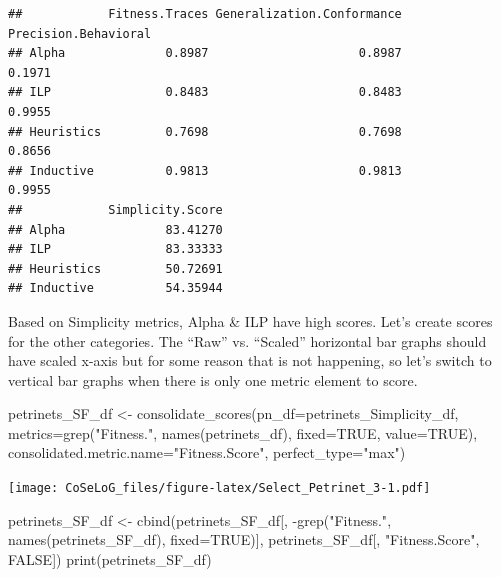 \documentclass[]{article}
\newenvironment{Shaded}{\begin{snugshade}}{\end{snugshade}}
\newcommand{\KeywordTok}[1]{\textcolor[rgb]{0.94,0.87,0.69}{{#1}}}
\newcommand{\DataTypeTok}[1]{\textcolor[rgb]{0.87,0.87,0.75}{{#1}}}
\newcommand{\StringTok}[1]{\textcolor[rgb]{0.80,0.58,0.58}{{#1}}}
\newcommand{\OtherTok}[1]{\textcolor[rgb]{0.94,0.94,0.56}{{#1}}}
\newcommand{\NormalTok}[1]{\textcolor[rgb]{0.80,0.80,0.80}{{#1}}}
\begin{document}
\begin{verbatim}
##            Fitness.Traces Generalization.Conformance Precision.Behavioral
## Alpha              0.8987                     0.8987               0.1971
## ILP                0.8483                     0.8483               0.9955
## Heuristics         0.7698                     0.7698               0.8656
## Inductive          0.9813                     0.9813               0.9955
##            Simplicity.Score
## Alpha              83.41270
## ILP                83.33333
## Heuristics         50.72691
## Inductive          54.35944
\end{verbatim}

Based on Simplicity metrics, Alpha \& ILP have high scores. Let's create
scores for the other categories. The ``Raw'' vs. ``Scaled'' horizontal
bar graphs should have scaled x-axis but for some reason that is not
happening, so let's switch to vertical bar graphs when there is only one
metric element to score.

\begin{Shaded}
\begin{Highlighting}[]
\NormalTok{petrinets_SF_df <-}\StringTok{ }\KeywordTok{consolidate_scores}\NormalTok{(}\DataTypeTok{pn_df=}\NormalTok{petrinets_Simplicity_df, }
        \DataTypeTok{metrics=}\KeywordTok{grep}\NormalTok{(}\StringTok{"Fitness."}\NormalTok{, }\KeywordTok{names}\NormalTok{(petrinets_df), }\DataTypeTok{fixed=}\OtherTok{TRUE}\NormalTok{, }\DataTypeTok{value=}\OtherTok{TRUE}\NormalTok{), }
        \DataTypeTok{consolidated.metric.name=}\StringTok{"Fitness.Score"}\NormalTok{,}
        \DataTypeTok{perfect_type=}\StringTok{"max"}\NormalTok{)}
\end{Highlighting}
\end{Shaded}

\texttt{[image: CoSeLoG\_files/figure-latex/Select\_Petrinet\_3-1.pdf]}

\begin{Shaded}
\begin{Highlighting}[]
\NormalTok{petrinets_SF_df <-}\StringTok{ }\KeywordTok{cbind}\NormalTok{(petrinets_SF_df[, }
            \NormalTok{-}\KeywordTok{grep}\NormalTok{(}\StringTok{"Fitness."}\NormalTok{, }\KeywordTok{names}\NormalTok{(petrinets_SF_df), }\DataTypeTok{fixed=}\OtherTok{TRUE}\NormalTok{)],}
            \NormalTok{petrinets_SF_df[, }\StringTok{"Fitness.Score"}\NormalTok{, }\OtherTok{FALSE}\NormalTok{])}
\KeywordTok{print}\NormalTok{(petrinets_SF_df)}
\end{Highlighting}
\end{Shaded}
\end{document}
